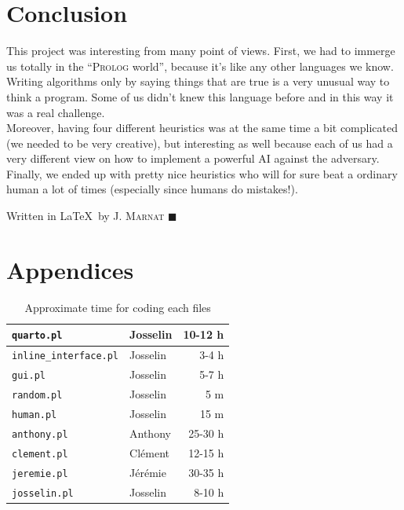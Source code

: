 \documentclass[a4paper,11pt]{article}
\newcommand{\tw}[1]{\texttt{#1}}
\newcommand{\mytable}[3]{
	\begin{table}[ht]
		\begin{center}
			\begin{tabular}{#2}
				#3
			\end{tabular}
		\caption{#1}
		\end{center}
	\end{table}
}
\begin{document}
	\section{Conclusion}
		This project was interesting from many point of views. First, we had to immerge us totally in the ``\textsc{Prolog} world'', because it's like any other languages we know. Writing algorithms only by saying things that are true is a very unusual way to think a program. Some of us didn't knew this language before and in this way it was a real challenge. \\
		Moreover, having four different heuristics was at the same time a bit complicated (we needed to be very creative), but interesting as well because each of us had a very different view on how to implement a powerful AI against the adversary. \\
		Finally, we ended up with pretty nice heuristics who will for sure beat a ordinary human a lot of times (especially since humans do mistakes!).

		\vfill
		\begin{flushright}
			\footnotesize{Written in \LaTeX\ by J. \textsc{Marnat} $\blacksquare$}
		\end{flushright}

	\newpage
	\section{Appendices}
		\mytable{Approximate time for coding each files}{|l||l|r|}{\hline
			\tw{quarto.pl}				& Josselin		& 10-12 h	\\\hline
			\tw{inline\_interface.pl}	& Josselin		& 3-4 h		\\\hline
			\tw{gui.pl}					& Josselin		& 5-7 h		\\\hline
			\tw{random.pl}				& Josselin		& 5 m		\\\hline
			\tw{human.pl}				& Josselin		& 15 m		\\\hline
			\tw{anthony.pl}				& Anthony		& 25-30 h	\\\hline
			\tw{clement.pl}				& Clément		& 12-15 h	\\\hline
			\tw{jeremie.pl}				& Jérémie		& 30-35 h	\\\hline
			\tw{josselin.pl}			& Josselin		& 8-10 h	\\\hline
		}
\end{document}
